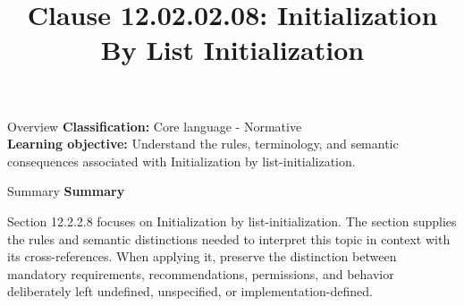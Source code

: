 \documentclass[10pt,letterpaper]{article}
\title{Clause 12.02.02.08: Initialization By List Initialization}
\author{}
\date{}
\begin{document}
\maketitle
\begin{CornellOverviewBox}{Overview}
\textbf{Classification:} Core language - Normative\\[2pt]
\textbf{Learning objective:} Understand the rules, terminology, and semantic consequences associated with Initialization by list-initialization.
\end{CornellOverviewBox}\begin{CornellSummaryBox}{Summary}
{\sffamily\bfseries\color{Accent} Summary}\par\vspace{3pt}Section 12.2.2.8 focuses on Initialization by list-initialization. The section supplies the rules and semantic distinctions needed to interpret this topic in context with its cross-references. When applying it, preserve the distinction between mandatory requirements, recommendations, permissions, and behavior deliberately left undefined, unspecified, or implementation-defined.
\end{CornellSummaryBox}
\end{document}
